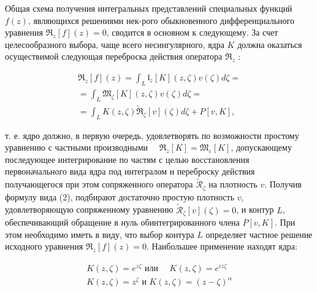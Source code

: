 \documentclass[10pt]{article}
\begin{document}
Общая схема получения интегральных представлений специальных функций $f(z)$, являющихся решениями нек-рого обыкновенного дифференциального уравнения $\mathfrak{R}_{z}[f](z)=0$, сводится в основном к следующему. За счет целесообразного выбора, чаще всего несингулярного, ядра $K$ должна оказаться осуществимой следующая переброска действия оператора $\mathfrak{R}_{z}$ :



\[

\begin{gathered}

\mathfrak{R}_{z}[f](z)=\int_{L} \mathfrak{l}_{z}[K](z, \zeta) v(\zeta) d \zeta= \\

=\int_{L} \mathfrak{M}_{\zeta}[K](z, \zeta) v(\zeta) d \zeta= \\

=\int_{L} K(z, \zeta) \tilde{\mathfrak{R}}_{\zeta}[v](\zeta) d \zeta+P[v, K],

\end{gathered}

\]



т. е. ядро должно, в первую очередь, удовлетворять по возможности простому уравнению с частными производными $\quad \mathfrak{R}_{z}[K]=\mathfrak{M}_{\varepsilon}[K]$, допускающему последующее интегрирование по частям с целью восстановления первоначального вида ядра под интегралом и переброску действия получающегося при этом сопряженного оператора $\tilde{\mathscr{R}}_{\zeta}$ на плотность $v$. Получив формулу вида (2), подбирают достаточно простую плотность $v$, удовлетворяющую сопряженному уравнению $\tilde{\mathscr{R}}_{\zeta}[v](\zeta)=0$, и контур $L$, обеспечивающий обращение в нуль обинтегрированного члена $P[v, K]$. При этом необходимо иметь в виду, что выбор контура $L$ определяет частное решение исходного уравнения $\mathfrak{R}_{z}[f](z)=0$. Наибольшее применение находят ядра:



\[

\begin{gathered}

K(z, \zeta)=e^{z \zeta} \text { или } \quad K(z, \zeta)=e^{i z \zeta} \\

K(z, \zeta)=z^{\zeta} \text { и } K(z, \zeta)=(z-\zeta)^{\alpha}

\end{gathered}

\]
\end{document}
